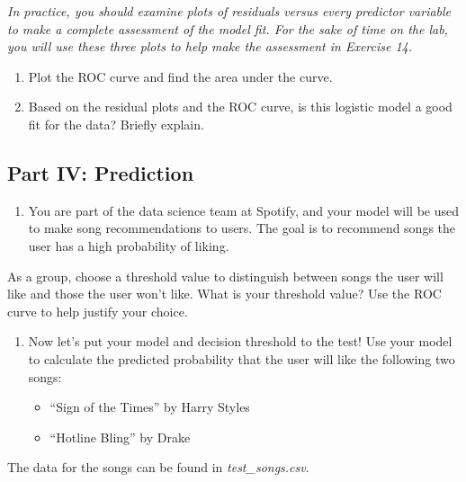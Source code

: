 \documentclass[]{book}
\providecommand{\tightlist}{%
  \setlength{\itemsep}{0pt}\setlength{\parskip}{0pt}}
\begin{document}
\emph{In practice, you should examine plots of residuals versus every
predictor variable to make a complete assessment of the model fit. For
the sake of time on the lab, you will use these three plots to help make
the assessment in Exercise 14.}

\begin{enumerate}
\def\labelenumi{\arabic{enumi}.}
\setcounter{enumi}{12}
\item
  Plot the ROC curve and find the area under the curve.
\item
  Based on the residual plots and the ROC curve, is this logistic model
  a good fit for the data? Briefly explain.
\end{enumerate}

\subsection{Part IV: Prediction}\label{part-iv-prediction}

\begin{enumerate}
\def\labelenumi{\arabic{enumi}.}
\setcounter{enumi}{14}
\tightlist
\item
  You are part of the data science team at Spotify, and your model will
  be used to make song recommendations to users. The goal is to
  recommend songs the user has a high probability of liking.
\end{enumerate}

As a group, choose a threshold value to distinguish between songs the
user will like and those the user won't like. What is your threshold
value? Use the ROC curve to help justify your choice.

\begin{enumerate}
\def\labelenumi{\arabic{enumi}.}
\setcounter{enumi}{15}
\item
  Now let's put your model and decision threshold to the test! Use your
  model to calculate the predicted probability that the user will like
  the following two songs:

  \begin{itemize}
  \tightlist
  \item
    ``Sign of the Times'' by Harry Styles
  \item
    ``Hotline Bling'' by Drake
  \end{itemize}
\end{enumerate}

The data for the songs can be found in \emph{test\_songs.csv}.
\end{document}

